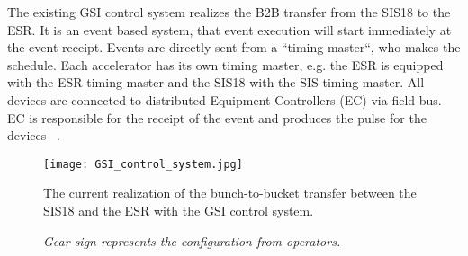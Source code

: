 The existing GSI control system realizes the B2B transfer from the SIS18 to the ESR. It is an event based system, that event execution will start immediately at the event receipt. Events are directly sent from a ``timing master``, who makes the schedule. Each accelerator has its own timing master, e.g. the ESR is equipped with the ESR-timing master and the SIS18 with the SIS-timing master. All devices are connected to distributed Equipment Controllers (EC) via field bus. EC is responsible for the receipt of the event and produces the pulse for the devices ~\cite{kainberger_pzs_2003, krause_re-engineering_2001}. 
\begin{figure}[H]
   \centering   
   \texttt{[image: GSI\_control\_system.jpg]}
   \caption{The current realization of the bunch-to-bucket transfer between the SIS18 and the ESR with the GSI control system.}
	\caption*{\textsl{\small{Gear sign represents the configuration from operators.}}}
   \label{GSI_control_system}
\end{figure}
